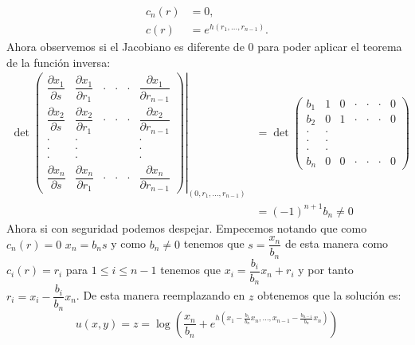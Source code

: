 \begin{homeworkProblem}
\begin{itemize}
\begin{solucion}
\begin{align*}
        c_n(r)&=0,\\
        c(r)&=e^{h(r_1,\dots,r_{n-1})}.
    \end{align*}
    Ahora observemos si el Jacobiano es diferente de 0 para poder aplicar el teorema de la función inversa:
    \begin{align*}
       \left. \det\begin{pmatrix}
            \dfrac{\partial x_1}{ \partial s} & \dfrac{ \partial x_1}{\partial r_{1}} & \cdot & \cdot & \cdot & \dfrac{\partial x_1}{\partial r_{n-1}}\\
            \dfrac{\partial x_2}{\partial s} & \dfrac{\partial x_2}{
            \partial r_{1}} & \cdot & \cdot & \cdot & \dfrac{\partial x_2}{\partial r_{n-1}}\\
            \cdot&\cdot & & & &\cdot \\
            \cdot&\cdot & & & &\cdot \\
            \cdot&\cdot & & & &\cdot \\
            \dfrac{\partial x_n}{\partial s} & \dfrac{\partial x_n}{
            \partial r_{1}} & \cdot & \cdot & \cdot & \dfrac{\partial x_n}{\partial r_{n-1}}
        \end{pmatrix}\right|_{(0,r_1,\dots,r_{n-1})}&=\det\begin{pmatrix}
            b_1& 1 & 0 & \cdot& \cdot& \cdot& 0\\
            b_2& 0 & 1 &\cdot& \cdot& \cdot& 0\\
            \cdot& \cdot& & & & & \\
            \cdot& \cdot& & & & & \\
            \cdot& \cdot& & & & & \\
            b_n & 0 & 0 & \cdot& \cdot& \cdot& 0
        \end{pmatrix}\\&=(-1)^{n+1}b_n\neq0
    \end{align*}
    Ahora si con seguridad podemos despejar. Empecemos notando que como $c_n(r)=0$ $x_n=b_ns$ y como $b_n\neq0$ tenemos que $s=\dfrac{x_n}{b_n}$ de esta manera como $c_i(r)=r_i$ para $1\leq i\leq n-1$ tenemos que $x_i=\dfrac{b_i}{b_n}x_n+r_i$ y por tanto $r_i=x_i-\dfrac{b_i}{b_n}x_n$. De esta manera reemplazando en $z$ obtenemos que la solución es:
    $$u(x,y)=z=\log\left(\frac{x_n}{b_n}+e^{h\left(x_1-\frac{b_1}{b_n}x_n,\dots,x_{n-1}-\frac{b_{n-1}}{b_n}x_n\right)}\right)$$
    \end{solucion}
   

\end{itemize}
\end{homeworkProblem}
